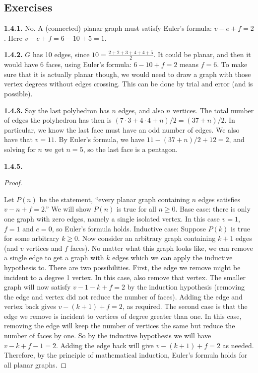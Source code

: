 \documentclass[10pt,]{book}
\theoremstyle{plain}
\theoremstyle{definition}
\theoremstyle{definition}
\theoremstyle{definition}
\theoremstyle{definition}
\numberwithin{equation}{chapter}
\begin{document}
\subsection*{ Exercises}
\noindent\textbf{1.4.1.} \hypertarget{p-284}{}%
No. A (connected) planar graph must satisfy Euler's formula: \(v - e + f = 2\). Here \(v - e + f = 6 - 10 + 5 = 1\).%
\par\smallskip
\noindent\textbf{1.4.2.} \hypertarget{p-286}{}%
\(G\) has 10 edges, since \(10 = \frac{2+2+3+4+4+5}{2}\). It could be planar, and then it would have 6 faces, using Euler's formula: \(6-10+f = 2\) means \(f = 6\).  To make sure that it is actually planar though, we would need to draw a graph with those vertex degrees without edges crossing.  This can be done by trial and error (and is possible).%
\par\smallskip
\noindent\textbf{1.4.3.} \hypertarget{p-288}{}%
Say the last polyhedron has \(n\) edges, and also \(n\) vertices. The total number of edges the polyhedron has then is \((7 \cdot 3 + 4 \cdot 4 + n)/2 = (37 + n)/2\). In particular, we know the last face must have an odd number of edges. We also have that \(v = 11 \).  By Euler's formula, we have \(11 - (37+n)/2 + 12 = 2\), and solving for \(n\) we get \(n = 5\), so the last face is a pentagon.%
\par\smallskip
\noindent\textbf{1.4.5.} \begin{proof}\hypertarget{proof-8}{}
\hypertarget{p-294}{}%
Let \(P(n)\) be the statement, ``every planar graph containing \(n\) edges satisfies \(v - n + f = 2\).'' We will show \(P(n)\) is true for all \(n \ge 0\). Base case: there is only one graph with zero edges, namely a single isolated vertex. In this case \(v = 1\), \(f = 1\) and \(e = 0\), so Euler's formula holds. Inductive case: Suppose \(P(k)\) is true for some arbitrary \(k \ge 0\). Now consider an arbitrary graph containing \(k+1\) edges (and \(v\) vertices and \(f\) faces). No matter what this graph looks like, we can remove a single edge to get a graph with \(k\) edges which we can apply the inductive hypothesis to. There are two possibilities. First, the edge we remove might be incident to a degree 1 vertex. In this case, also remove that vertex. The smaller graph will now satisfy \(v-1 - k + f = 2\) by the induction hypothesis (removing the edge and vertex did not reduce the number of faces). Adding the edge and vertex back gives \(v - (k+1) + f = 2\), as required. The second case is that the edge we remove is incident to vertices of degree greater than one. In this case, removing the edge will keep the number of vertices the same but reduce the number of faces by one. So by the inductive hypothesis we will have \(v - k + f-1 = 2\). Adding the edge back will give \(v - (k+1) + f = 2\) as needed. Therefore, by the principle of mathematical induction, Euler's formula holds for all planar graphs.%
\end{proof}
\end{document}

